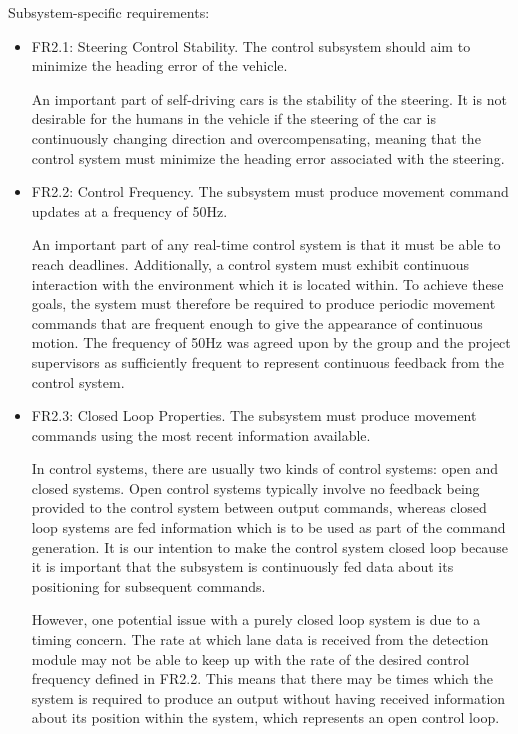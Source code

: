 \documentclass[titlepage,draft]{article}
\begin{document}
{\begin{itemize}
\end{itemize}
Subsystem-specific requirements:
\begin{itemize}


	\item FR2.1: Steering Control Stability. The control subsystem should aim to minimize the heading error of the vehicle.

	      An important part of self-driving cars is the stability of the steering. It is not desirable for the humans in the vehicle if the steering of the car is continuously changing direction and overcompensating, meaning that the control system must minimize the heading error associated with the steering.

	\item FR2.2: Control Frequency.
	      The subsystem must produce movement command updates at a frequency of 50Hz.

	      An important part of any real-time control system is that it must be able to reach deadlines. Additionally, a control system must exhibit continuous interaction with the environment which it is located within. To achieve these goals, the system must therefore be required to produce periodic movement commands that are frequent enough to give the appearance of continuous motion. The frequency of 50Hz was agreed upon by the group and the project supervisors as sufficiently frequent to represent continuous feedback from the control system.

	\item FR2.3: Closed Loop Properties.
	      The subsystem must produce movement commands using the most recent information available.

	      In control systems, there are usually two kinds of control systems: open and closed systems. Open control systems typically involve no feedback being provided to the control system between output commands, whereas closed loop systems are fed information which is to be used as part of the command generation. It is our intention to make the control system closed loop because it is important that the subsystem is continuously fed data about its positioning for subsequent commands.

	      However, one potential issue with a purely closed loop system is due to a timing concern. The rate at which lane data is received from the detection module may not be able to keep up with the rate of the desired control frequency defined in FR2.2. This means that there may be times which the system is required to produce an output without having received information about its position within the system, which represents an open control loop.


\end{itemize}}
\end{document}
